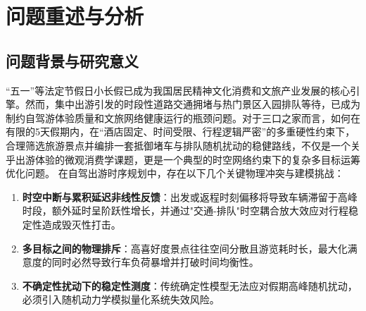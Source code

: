 \documentclass{cumcmthesis}
\begin{document}
\begin{abstract}
\textbf{关键词}：自驾行程规划；熵权TOPSIS-GRA；混合整数规划；乐观上限限界定理；蒙特卡洛动力学仿真；方差贡献率
\end{abstract}
\newpage
\section{问题重述与分析}
\subsection{问题背景与研究意义}
“五一”等法定节假日小长假已成为我国居民精神文化消费和文旅产业发展的核心引擎。然而，集中出游引发的时段性道路交通拥堵与热门景区入园排队等待，已成为制约自驾游体验质量和文旅网络健康运行的瓶颈问题。对于三口之家而言，如何在有限的5天假期内，在“酒店固定、时间受限、行程逻辑严密”的多重硬性约束下，合理筛选旅游景点并编排一套抵御堵车与排队随机扰动的稳健路线，不仅是一个关乎出游体验的微观消费学课题，更是一个典型的时空网络约束下的复杂多目标运筹优化问题\cite{ref13, ref14}。
在自驾出游时序规划中，存在以下几个关键物理冲突与建模挑战：
\begin{enumerate}
\item \textbf{时空中断与累积延迟非线性反馈}：出发或返程时刻偏移将导致车辆滞留于高峰时段，额外延时呈阶跃性增长，并通过"交通-排队"时空耦合放大效应对行程稳定性造成毁灭性打击。
\item \textbf{多目标之间的物理排斥}：高喜好度景点往往空间分散且游览耗时长，最大化满意度的同时必然导致行车负荷暴增并打破时间均衡性。
\item \textbf{不确定性扰动下的稳定性测度}：传统确定性模型无法应对假期高峰随机扰动，必须引入随机动力学模拟量化系统失效风险。
\end{enumerate}
\end{document}
